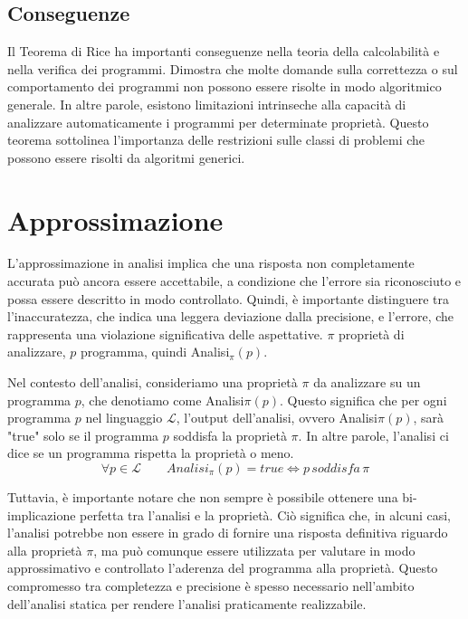 \subsection{Conseguenze}

Il Teorema di Rice ha importanti conseguenze nella teoria della calcolabilità e nella
verifica dei programmi. Dimostra che molte domande sulla correttezza o sul comportamento
dei programmi non possono essere risolte in modo algoritmico generale. In altre parole, esistono
limitazioni intrinseche alla capacità di analizzare automaticamente i programmi per determinate proprietà.
Questo teorema sottolinea l'importanza delle restrizioni sulle classi di problemi che possono essere risolti
da algoritmi generici.

\section{Approssimazione}
L'approssimazione in analisi implica che una risposta non completamente accurata
può ancora essere accettabile, a condizione che l'errore sia riconosciuto e possa essere
descritto in modo controllato. Quindi, è importante distinguere tra l'inaccuratezza,
che indica una leggera deviazione dalla precisione,
e l'errore, che rappresenta una violazione significativa delle aspettative.
$\pi$ proprietà di analizzare, $p$ programma, quindi Analisi$_{\pi}(p)$.

Nel contesto dell'analisi, consideriamo una proprietà $\pi$ da analizzare su un programma $p$,
che denotiamo come Analisi${\pi}(p)$. Questo significa che per ogni programma $p$ nel linguaggio
$\mathcal{L}$, l'output dell'analisi, ovvero Analisi${\pi}(p)$, sarà "true" solo se il programma
$p$ soddisfa la proprietà $\pi$. In altre parole, l'analisi ci dice se un programma rispetta la proprietà o meno.
\[
    \forall p \in \mathcal{L}\qquad
    Analisi_{\pi}(p) = \textit{true} \Leftrightarrow p \, \textit{soddisfa} \,\pi
\]

Tuttavia, è importante notare che non sempre è possibile ottenere una bi-implicazione
perfetta tra l'analisi e la proprietà. Ciò significa che, in alcuni casi, l'analisi potrebbe
non essere in grado di fornire una risposta definitiva riguardo alla proprietà $\pi$, ma può
comunque essere utilizzata per valutare in modo approssimativo e controllato l'aderenza del programma
alla proprietà. Questo compromesso tra completezza e precisione è spesso
necessario nell'ambito dell'analisi statica per rendere l'analisi praticamente realizzabile.

